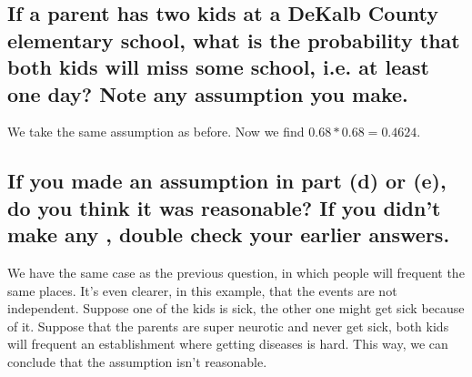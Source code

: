 \documentclass[11pt]{article}
\begin{document}
\subsection{If a parent has two kids at a DeKalb County elementary school, what is the probability that both kids will miss some school, i.e. at least one day? Note any assumption you make.}
\label{sec:org2564ecc}
We take the same assumption as before. Now we find \(0.68 * 0.68 = 0.4624\).
\subsection{If you made an assumption in part (d) or (e), do you think it was reasonable? If you didn't make any \assumptions, double check your earlier answers.}
\label{sec:org7847b57}
We have the same case as the previous question, in which people will frequent the same places. It's even clearer, in this example, that the events are not independent. Suppose one of the kids is sick, the other one might get sick because of it. Suppose that the parents are super neurotic and never get sick, both kids will frequent an establishment where getting diseases is hard. This way, we can conclude that the assumption isn't reasonable.
\end{document}
